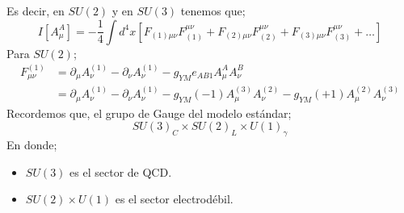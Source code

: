 \documentclass[../main.tex]{subfiles}
\begin{document}
 Es decir, en $SU(2)$ y en $SU(3)$ tenemos que;
 \begin{equation}
   I[A_\mu^A] = -\frac{1}{4} \int d^4x \left[ F_{(1)\mu\nu}F^{\mu\nu}_{(1)} + F_{(2)\mu\nu}F^ {\mu\nu}_{(2)} + F_{(3)\mu\nu} F_{(3)}^{\mu\nu} + \dots \right]
  \end{equation}
  Para $SU(2)$;
  \begin{align*}
    F_{\mu\nu}^{(1)} & = \partial_\mu A^{(1)}_\nu - \partial_\nu A^{(1)}_\nu - g_{YM} e_{AB1} A^A_\mu A^B_\nu \\
    & = \partial_\mu A^{(1)}_\nu - \partial_\nu A^{(1)}_{\nu} - g_{YM} \left( -1 \right) A^{(3)}_{\mu} A^{(2)}_\nu - g_{YM}\left( +1 \right) A^{(2)}_\mu A^{(3)}_\nu
  \end{align*}
Recordemos que, el grupo de Gauge del modelo estándar;
\begin{equation}
  SU(3)_C\times SU(2)_L \times U(1)_\gamma
 \end{equation}
 En donde;
 \begin{itemize}
   \item $SU(3)$ es el sector de QCD.
   \item $SU(2)\times U(1)$ es el sector electrodébil. 
 \end{itemize}
\end{document}
